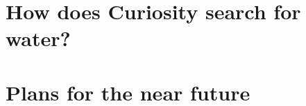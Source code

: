 \documentclass[DIV=calc, paper=a4, fontsize=12pt]{scrartcl}	 %
\begin{document}
\begin{multicols}{2}




\end{multicols}
\pagebreak
\section*{How does Curiosity search for water?}
\begin{multicols}{2}















\end{multicols}

\section*{Plans for the near future}

\begin{multicols}{2}







\end{multicols}


\end{document}
